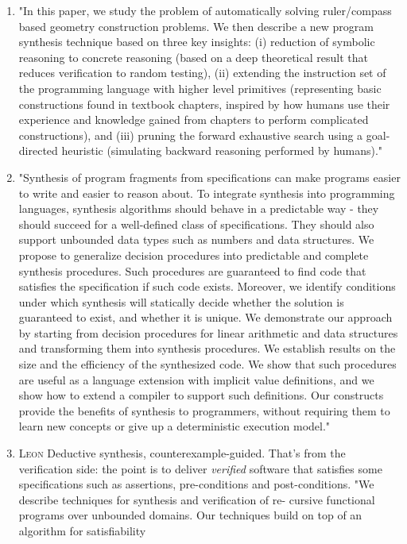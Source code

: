 \begin{enumerate}
\item \cite{Gulwani:2011:SGC:1993498.1993505} "In this paper, we study the problem of automatically solving ruler/compass based geometry construction problems. We then describe a new program synthesis technique based on three key insights: (i) reduction of symbolic reasoning to concrete reasoning (based on a deep theoretical result that reduces verification to random testing), (ii) extending the instruction set of the programming language with higher level primitives (representing basic constructions found in textbook chapters, inspired by how humans use their experience and knowledge gained from chapters to perform complicated constructions), and (iii) pruning the forward exhaustive search using a goal-directed heuristic (simulating backward reasoning performed by humans)."
\item \cite{Kuncak:2010:CFS:1806596.1806632} "Synthesis of program fragments from specifications can make programs easier to write and easier to reason about. To integrate synthesis into programming languages, synthesis algorithms should behave in a predictable way - they should succeed for a well-defined class of specifications. They should also support unbounded data types such as numbers and data structures. We propose to generalize decision procedures into predictable and complete synthesis procedures. Such procedures are guaranteed to find code that satisfies the specification if such code exists. Moreover, we identify conditions under which synthesis will statically decide whether the solution is guaranteed to exist, and whether it is unique. We demonstrate our approach by starting from decision procedures for linear arithmetic and data structures and transforming them into synthesis procedures. We establish results on the size and the efficiency of the synthesized code. We show that such procedures are useful as a language extension with implicit value definitions, and we show how to extend a compiler to support such definitions. Our constructs provide the benefits of synthesis to programmers, without requiring them to learn new concepts or give up a deterministic execution model."
\item \textsc{Leon} Deductive synthesis, counterexample-guided.
That's from the verification side: the point is to deliver \emph{verified} software that satisfies some specifications such as assertions, pre-conditions and post-conditions.
"We describe techniques for synthesis and verification of re-
cursive functional programs over unbounded domains. Our
techniques build on top of an algorithm for satisfiability

\end{enumerate}
